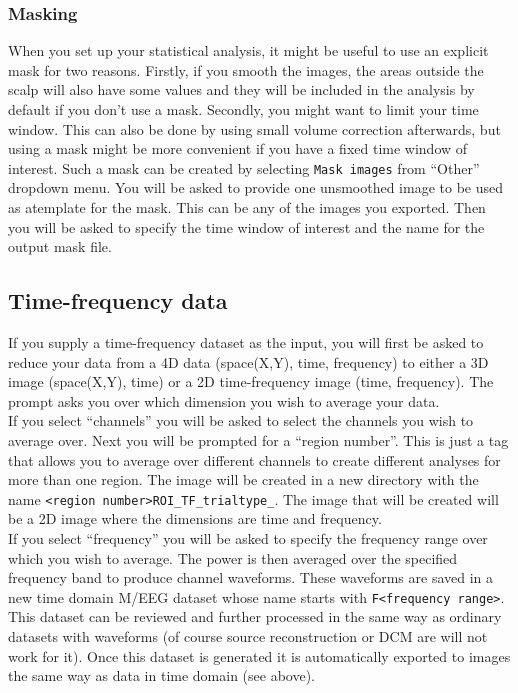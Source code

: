 \subsubsection{Masking}
When you set up your statistical analysis, it might be useful to use an explicit mask for two reasons. Firstly, if you smooth the images, the areas outside the scalp will also have some values and they will be included in the analysis by default if you don't use a mask. Secondly, you might want to limit your time window. This can also be done by using small volume correction afterwards, but using a mask might be more convenient if you have a fixed time window of interest. Such a mask can be created by selecting \texttt{Mask images} from ``Other'' dropdown menu. You will be asked to provide one unsmoothed image to be used as atemplate for the mask. This can be any of the images you exported. Then you will be asked to specify the time window of interest and the name for the output mask file. 
\\
\subsection{Time-frequency data}
If you supply a time-frequency dataset as the input, you will first be asked to reduce your data from a 4D data (space(X,Y), time, frequency) to either a 3D image (space(X,Y), time) or a 2D time-frequency image (time, frequency). The prompt asks you over which dimension you wish to average your data.
\\
If you select ``channels'' you will be asked to select the channels you wish to average over. Next you will be prompted for a ``region number''. This is just a tag that allows you to average over different channels to create different analyses for more than one region. The image will be created in a new directory with the name \texttt{<region number>ROI\_TF\_trialtype\_<condition number>}. The image that will be created will be a 2D image where the dimensions are time and frequency. 
\\
If you select ``frequency'' you will be asked to specify the frequency range over which you wish to average. The power is then averaged over the specified frequency band to produce channel waveforms. These waveforms are saved in a new time domain M/EEG dataset whose name starts with \texttt{F<frequency range>}. This dataset can be reviewed and further processed in the same way as ordinary datasets with waveforms (of course source reconstruction or DCM are will not work for it). Once this dataset is generated it is automatically exported to images the same way as data in time domain (see above). 
\\
